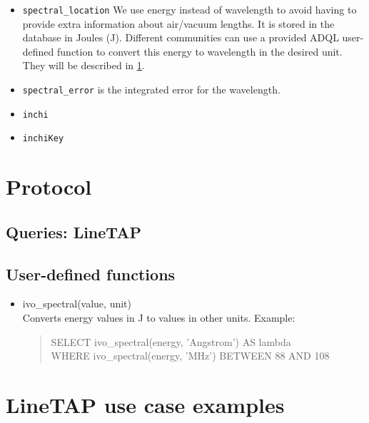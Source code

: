 \documentclass[11pt,a4paper]{ivoa}
\begin{document}
\begin{itemize}
\item \texttt{spectral\_location} 
We use energy instead of wavelength to avoid having to provide extra information about
air/vacuum lengths. It is stored in the database in Joules (J). Different communities can use 
a provided  ADQL user-defined function to convert this energy to wavelength in the desired 
unit. They will be described in
\ref{sec:Protocol}.
\\
\item \texttt{spectral\_error} is the integrated error for the wavelength.

\item \texttt{inchi} 
\item \texttt{inchiKey} 
\end{itemize}


\section{Protocol }
\label{sec:Protocol}
\subsection{ Queries: LineTAP }

\subsection{User-defined functions}

\begin{itemize}
\item ivo\_spectral(value, unit)\\
Converts energy values in J to values in other units. Example:\\
\begin{quote}
SELECT ivo\_spectral(energy, 'Angstrom') AS lambda \\
 WHERE ivo\_spectral(energy, 'MHz') BETWEEN 88 AND 108
\end{quote}

\end{itemize}




\section{LineTAP use case examples}
\end{document}
